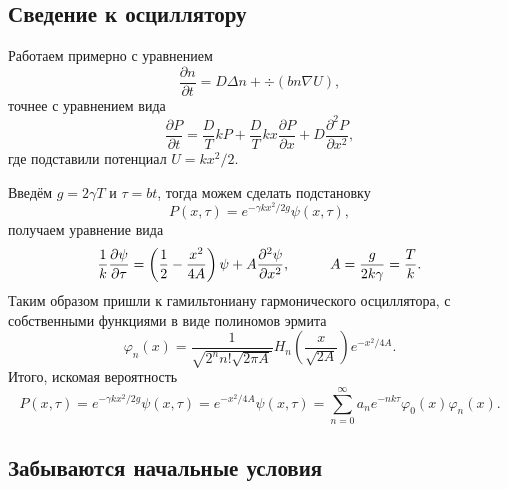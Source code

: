 \subsection{Сведение к осциллятору}

Работаем примерно с уравнением 
\begin{equation*}
	\frac{\partial n}{\partial t} = D \Delta n + \div(b n \nabla U),
\end{equation*}
точнее с уравнением вида
\begin{equation*}
	\frac{\partial P}{\partial t} = \frac{D}{T} k P + \frac{D}{T} k x \frac{\partial P}{\partial x}  + D \frac{\partial^2 P}{\partial x^2} ,
\end{equation*}
где подставили потенциал $U = kx^2/2$.

Введём $g=2 \gamma T$ и $\tau = b t$, тогда можем сделать подстановку
\begin{equation*}
	P(x, \tau) = e^{-\gamma k x^2/2g} \psi(x, \tau),
\end{equation*}
получаем уравнение вида
\begin{equation*}
	\frac{1}{k} \frac{\partial \psi}{\partial \tau} = \left(
		\frac{1}{2} - \frac{x^2}{4A}
	\right) \psi + A \frac{\partial^2 \psi}{\partial x^2},
	\hspace{10 mm} 
	A = \frac{g}{2k \gamma} = \frac{T}{k}. 
\end{equation*}
Таким образом пришли к гамильтониану гармонического осциллятора, с собственными функциями в виде полиномов эрмита
\begin{equation*}
	\varphi_n (x) = \frac{1}{\sqrt{2^n n! \sqrt{2\pi A}}} H_n\left(\frac{x}{\sqrt{2A}}\right) e^{-x^2/4A}.
\end{equation*}
Итого, искомая вероятность
\begin{equation*}
	P(x, \tau) = e^{-\gamma k x^2/2g} \psi(x, \tau) = e^{-x^2/4A} \psi(x, \tau) = \sum_{n=0}^{\infty} a_n e^{- n k \tau} \varphi_0(x) \varphi_n(x).
\end{equation*}


\subsection{Забываются начальные условия}

